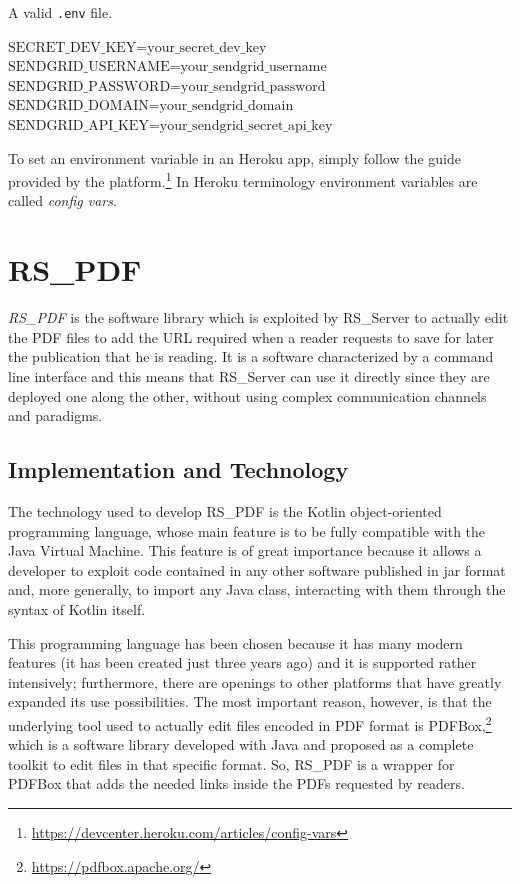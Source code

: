 \documentclass[a4paper, english]{article}
\newcounter{subsubsubsection}[subsubsection]
\begin{document}
\begin{algorithm}[h]
\caption{A valid \texttt{.env} file.}
\label{env-file}
\begin{algorithmic}[1]
\State$\text{SECRET\_DEV\_KEY=your\_secret\_dev\_key}$
\State$\text{SENDGRID\_USERNAME=your\_sendgrid\_username}$
\State$\text{SENDGRID\_PASSWORD=your\_sendgrid\_password}$
\State$\text{SENDGRID\_DOMAIN=your\_sendgrid\_domain}$
\State$\text{SENDGRID\_API\_KEY=your\_sendgrid\_secret\_api\_key}$
\end{algorithmic}
\end{algorithm}


To set an environment variable in an Heroku app, simply follow the guide provided by the platform.\footnote{\url{https://devcenter.heroku.com/articles/config-vars}} In Heroku terminology environment variables are called \emph{config vars}.


\section{RS\_PDF}

\emph{RS\_PDF} is the software library which is exploited by RS\_Server to actually edit the PDF files to add the URL required when a reader requests to save for later the publication that he is reading. 
It is a software characterized by a command line interface and this means that RS\_Server can use it directly since they are deployed one along the other, without using complex communication channels and paradigms.    

\subsection{Implementation and Technology}

The technology used to develop RS\_PDF is the Kotlin object-oriented programming language, whose main feature is to be fully compatible with the Java Virtual Machine. This feature is of great importance because it allows a developer to exploit code contained in any other software published in jar format and, more generally, to import any Java class, interacting with them through the syntax of Kotlin itself.

This programming language has been chosen because it has many modern features (it has been created just three years ago) and it is supported rather intensively; furthermore, there are openings to other platforms that have greatly expanded its use possibilities. The most important reason, however, is that the underlying tool used to actually edit files encoded in PDF format is PDFBox,\footnote{\url{https://pdfbox.apache.org/}} which is a software library  developed with Java and proposed as a complete toolkit to edit files in that specific format. So, RS\_PDF is a wrapper for PDFBox that adds the needed links inside the PDFs requested by readers. %
\end{document}

